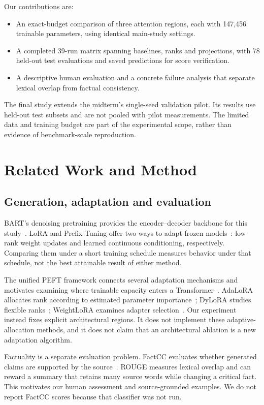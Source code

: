 \documentclass[11pt,letterpaper]{article}
\begin{document}
Our contributions are:
\begin{itemize}
\item An exact-budget comparison of three attention regions, each with 147,456 trainable parameters, using identical main-study settings.
\item A completed 39-run matrix spanning baselines, ranks and projections, with 78 held-out test evaluations and saved predictions for score verification.
\item A descriptive human evaluation and a concrete failure analysis that separate lexical overlap from factual consistency.
\end{itemize}
The final study extends the midterm's single-seed validation pilot. Its results use held-out test subsets and are not pooled with pilot measurements. The limited data and training budget are part of the experimental scope, rather than evidence of benchmark-scale reproduction.

\section{Related Work and Method}
\subsection{Generation, adaptation and evaluation}
BART's denoising pretraining provides the encoder--decoder backbone for this study~\cite{bart}. LoRA and Prefix-Tuning offer two ways to adapt frozen models~\cite{lora,prefix}: low-rank weight updates and learned continuous conditioning, respectively. Comparing them under a short training schedule measures behavior under that schedule, not the best attainable result of either method.

The unified PEFT framework connects several adaptation mechanisms and motivates examining where trainable capacity enters a Transformer~\cite{unified}. AdaLoRA allocates rank according to estimated parameter importance~\cite{adalora}; DyLoRA studies flexible ranks~\cite{dylora}; WeightLoRA examines adapter selection~\cite{weightlora}. Our experiment instead fixes explicit architectural regions. It does not implement these adaptive-allocation methods, and it does not claim that an architectural ablation is a new adaptation algorithm.

Factuality is a separate evaluation problem. FactCC evaluates whether generated claims are supported by the source~\cite{factcc}. ROUGE measures lexical overlap and can reward a summary that retains many source words while changing a critical fact. This motivates our human assessment and source-grounded examples. We do not report FactCC scores because that classifier was not run.
\end{document}
